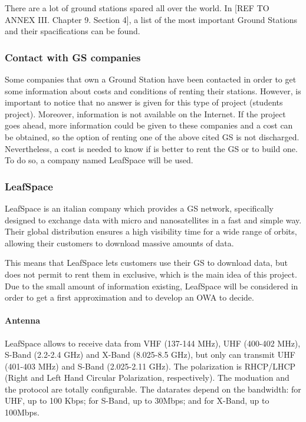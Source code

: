There are a lot of ground stations spared all over the world. In [{REF TO ANNEX III. Chapter 9. Section 4}], a list of the most important Ground Stations and their spacifications can be found.

\subsubsection{Contact with GS companies}
Some companies that own a Ground Station have been contacted in order to get some information about costs and conditions of renting their stations. However, is important to notice that no answer is given for this type of project (students project). Moreover, information is not available on the Internet. If the project goes ahead, more information could be given to these companies and a cost can be obtained, so the option of renting one of the above cited GS is not discharged. Nevertheless, a cost is needed to know if is better to rent the GS or to build one. To do so, a company named LeafSpace will be used.

\subsubsection{LeafSpace}
LeafSpace is an italian company which provides a GS network, specifically designed to exchange data with micro and nanosatellites in a fast and simple way. Their global distribution ensures a high visibility time for a wide range of orbits, allowing their customers to download massive amounts of data.

This means that LeafSpace lets customers use their GS to download data, but does not permit to rent them in exclusive, which is the main idea of this project. Due to the small amount of information existing, LeafSpace will be considered in order to get a first approximation and to develop an OWA to decide. 

\paragraph{Antenna}
LeafSpace allows to receive data from VHF (137-144 MHz), UHF (400-402 MHz), S-Band (2.2-2.4 GHz) and X-Band (8.025-8.5 GHz), but only can transmit UHF (401-403 MHz) and S-Band (2.025-2.11 GHz). The polarization is RHCP/LHCP (Right and Left Hand Circular Polarization, respectively). The moduation and the protocol are totally configurable. The datarates depend on the bandwidth: for UHF, up to 100 Kbps; for S-Band, up to 30Mbps; and for X-Band, up to 100Mbps. 

